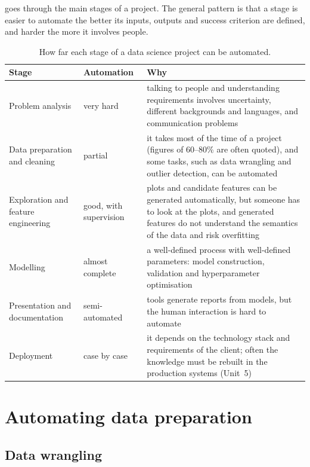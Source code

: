  goes through the main stages of a project. The general pattern is that a stage
is easier to automate the better its inputs, outputs and success criterion are defined, and harder
the more it involves people.

\begin{table}[htbp]
\centering\small
\caption{How far each stage of a data science project can be automated.}\label{tab:automation}
\begin{tabularx}{\textwidth}{@{}>{\raggedright\arraybackslash}p{2.6cm}>{\raggedright\arraybackslash}p{2.1cm}X@{}}
\toprule
Stage & Automation & Why\\
\midrule
Problem analysis & very hard & talking to people and understanding requirements involves
uncertainty, different backgrounds and languages, and communication problems\\
Data preparation and cleaning & partial & it takes most of the time of a project (figures of 60--80\%
are often quoted), and some tasks, such as data wrangling and outlier detection, can be automated\\
Exploration and feature engineering & good, with supervision & plots and candidate features can be
generated automatically, but someone has to look at the plots, and generated features do not
understand the semantics of the data and risk overfitting\\
Modelling & almost complete & a well-defined process with well-defined parameters: model
construction, validation and hyperparameter optimisation\\
Presentation and documentation & semi-automated & tools generate reports from models, but the
human interaction is hard to automate\\
Deployment & case by case & it depends on the technology stack and requirements of the client;
often the knowledge must be rebuilt in the production systems (Unit~5)\\
\bottomrule
\end{tabularx}
\end{table}

\section{Automating data preparation}\label{sec:autoprep}

\subsection{Data wrangling}

